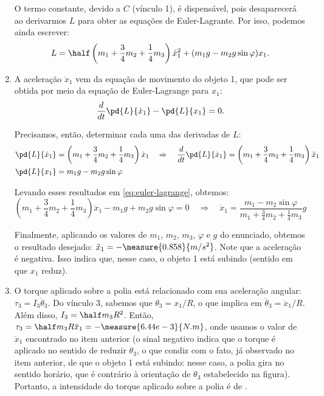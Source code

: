 \begin{question}
\begin{solution}
\begin{enumerate}
			O termo constante, devido a $C$ (vínculo 1), é dispensável, pois desaparecerá ao derivarmos $L$ para obter as equações de Euler-Lagrante.
			Por isso, podemos ainda escrever:
			\begin{equation*}
				L = \half\left(m_1 + \frac{3}{4}m_2 + \frac{1}{4}m_3\right)\dot x_1^2 + (m_1 g - m_2 g \sin\varphi)x_1.
			\end{equation*}

			\item A aceleração $\ddot x_1$ vem da equação de movimento do objeto 1, que pode ser obtida por meio da equação de Euler-Lagrange para $x_1$:
			\begin{equation}\label{eq:euler-lagrange}
				\frac{d}{dt}\pd{L}{\dot x_1} - \pd{L}{x_1} = 0.
			\end{equation}

			Precisamos, então, determinar cada uma das derivadas de $L$:
			\begin{align*}
				\pd{L}{\dot x_1} &= \left(m_1 + \frac{3}{4}m_2 + \frac{1}{4}m_3\right)\dot x_1 \quad\Rightarrow\quad
					\frac{d}{dt}\pd{L}{\dot x_1} = \left(m_1 + \frac{3}{4}m_2 + \frac{1}{4}m_3\right)\ddot x_1 \\
				\pd{L}{x_1} &= m_1g - m_2g\sin\varphi
			\end{align*}

			Levando esses resultados em \eqref{eq:euler-lagrange}, obtemos:
			\begin{equation*}
				\left(m_1 + \frac{3}{4}m_2 + \frac{1}{4}m_3\right)\ddot x_1 - m_1 g + m_2 g \sin \varphi = 0
				\quad\Rightarrow\quad
				\ddot x_1 = \frac{m_1 - m_2 \sin \varphi}{m_1 + \frac{3}{4}m_2 + \frac{1}{4}m_3}g
			\end{equation*}

			Finalmente, aplicando os valores de $m_1$, $m_2$, $m_3$, $\varphi$ e $g$ do enunciado, obtemos o resultado desejado: $\ddot x_1 = -\measure{0.858}{m/s^2}$. %
			Note que a aceleração é negativa.
			Isso indica que, nesse caso, o objeto 1 está subindo (sentido em que $x_1$ reduz).

			\item O torque aplicado sobre a polia está relacionado com sua aceleração angular: $\tau_3 = I_3 \ddot\theta_3$.
			Do vínculo 3, sabemos que $\theta_3 = x_1/R$, o que implica em $\ddot\theta_3 = \ddot x_1/R$.
			Além disso, $I_3 = \half m_3 R^2$.
			Então, $\tau_3 = \half m_3 R \ddot x_1 = -\measure{6.44e-3}{N.m}$, onde usamos o valor de $\ddot x_1$ encontrado no item anterior (o sinal negativo indica que o torque é aplicado no sentido de reduzir $\theta_3$, o que condiz com o fato, já observado no item anterior, de que o objeto 1 está subindo: nesse caso, a polia gira no sentido horário, que é contrário à orientação de $\theta_3$ estabelecido na figura). %
			Portanto, a intensidade do torque aplicado sobre a polia é de . %
		\end{enumerate}
	\end{solution}
\end{question}